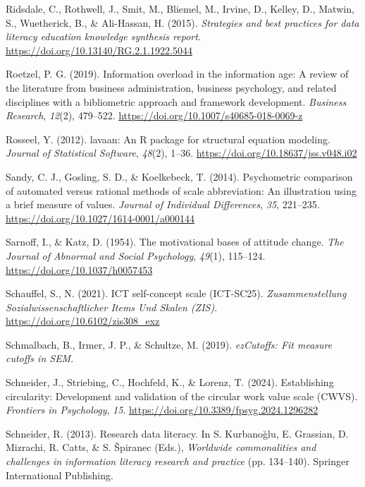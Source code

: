 \documentclass[
  12pt,
  a4paper,
  twoside]{article}
\newlength{\cslhangindent}
\newenvironment{CSLReferences}[2] %
 {\begin{list}{}{%
  \setlength{\itemindent}{0pt}
  \setlength{\leftmargin}{0pt}
  \setlength{\parsep}{0pt}
  \ifodd #1
   \setlength{\leftmargin}{\cslhangindent}
   \setlength{\itemindent}{-1\cslhangindent}
  \fi
  \setlength{\itemsep}{#2\baselineskip}}}
 {\end{list}}
\begin{document}
\begin{CSLReferences}{1}{0}
Ridsdale, C., Rothwell, J., Smit, M., Bliemel, M., Irvine, D., Kelley, D., Matwin, S., Wuetherick, B., \& Ali-Hassan, H. (2015). \emph{Strategies and best practices for data literacy education knowledge synthesis report}. \url{https://doi.org/10.13140/RG.2.1.1922.5044}

Roetzel, P. G. (2019). Information overload in the information age: A review of the literature from business administration, business psychology, and related disciplines with a bibliometric approach and framework development. \emph{Business Research}, \emph{12}(2), 479--522. \url{https://doi.org/10.1007/s40685-018-0069-z}

Rosseel, Y. (2012). {lavaan}: An {R} package for structural equation modeling. \emph{Journal of Statistical Software}, \emph{48}(2), 1--36. \url{https://doi.org/10.18637/jss.v048.i02}

Sandy, C. J., Gosling, S. D., \& Koelkebeck, T. (2014). Psychometric comparison of automated versus rational methods of scale abbreviation: An illustration using a brief measure of values. \emph{Journal of Individual Differences}, \emph{35}, 221--235. \url{https://doi.org/10.1027/1614-0001/a000144}

Sarnoff, I., \& Katz, D. (1954). The motivational bases of attitude change. \emph{The Journal of Abnormal and Social Psychology}, \emph{49}(1), 115--124. \url{https://doi.org/10.1037/h0057453}

Schauffel, S., N. (2021). ICT self-concept scale (ICT-SC25). \emph{Zusammenstellung Sozialwissenschaftlicher Items Und Skalen (ZIS)}. \url{https://doi.org/10.6102/zis308_exz}

Schmalbach, B., Irmer, J. P., \& Schultze, M. (2019). \emph{ezCutoffs: Fit measure cutoffs in SEM}.

Schneider, J., Striebing, C., Hochfeld, K., \& Lorenz, T. (2024). Establishing circularity: Development and validation of the circular work value scale (CWVS). \emph{Frontiers in Psychology}, \emph{15}. \url{https://doi.org/10.3389/fpsyg.2024.1296282}

Schneider, R. (2013). Research data literacy. In S. Kurbanoğlu, E. Grassian, D. Mizrachi, R. Catts, \& S. Špiranec (Eds.), \emph{Worldwide commonalities and challenges in information literacy research and practice} (pp. 134--140). Springer International Publishing.


\end{CSLReferences}
\end{document}
